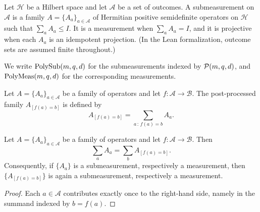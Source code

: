 \begin{definition}\label{def:submeasurement}
	\leanok
	Let $\mathcal H$ be a Hilbert space and let $\mathcal A$ be a set of outcomes. A submeasurement on $\mathcal A$ is a family $A=\{A_a\}_{a \in \mathcal A}$ of Hermitian positive semidefinite operators on $\mathcal H$ such that $\sum_a A_a \le I$. It is a measurement when $\sum_a A_a = I$, and it is projective when each $A_a$ is an idempotent projection. (In the Lean formalization, outcome sets are assumed finite throughout.)
\end{definition}

\begin{definition}\label{def:polymeasurements}
	\leanok
	We write $\mathrm{PolySub}(m,q,d)$ for the submeasurements indexed by $\mathcal{P}(m,q,d)$, and $\mathrm{PolyMeas}(m,q,d)$ for the corresponding measurements.
\end{definition}

\begin{definition}\label{def:post-processing}
	\leanok
	Let $A=\{A_a\}_{a \in \mathcal A}$ be a family of operators and let $f\colon \mathcal A \to \mathcal B$. The post-processed family $A_{[f(a)=b]}$ is defined by
	\[
		A_{[f(a)=b]} = \sum_{a\, :\, f(a)=b} A_a.
	\]
\end{definition}

\begin{proposition}\label{prop:post-processing-preserves}
	\leanok
	Let $A=\{A_a\}_{a \in \mathcal A}$ be a family of operators and let
	$f\colon \mathcal A \to \mathcal B$. Then
	\[
		\sum_a A_a = \sum_b A_{[f(a)=b]}.
	\]
	Consequently, if $\{A_a\}$ is a submeasurement, respectively a measurement, then
	$\{A_{[f(a)=b]}\}$ is again a submeasurement, respectively a measurement.
\end{proposition}
\begin{proof}
	\leanok
	Each $a \in \mathcal A$ contributes exactly once to the right-hand side, namely in
	the summand indexed by $b=f(a)$.
\end{proof}

